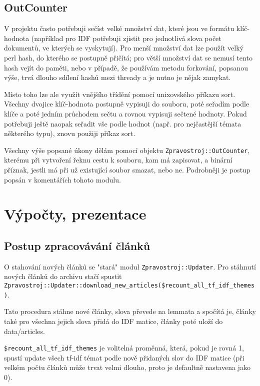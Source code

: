 \documentclass[12pt,a4paper]{report}
\begin{document}
\subsection{OutCounter}

V projektu často potřebuji sečíst velké množství dat, které jsou ve formátu klíč-hodnota (například pro IDF potřebuji zjistit pro jednotlivá slova počet dokumentů, ve kterých se vyskytují). Pro menší množství dat lze použít velký perl hash, do kterého se postupně přičítá; pro větší množství dat se nemusí tento hash vejít do paměti, nebo v případě, že používám metodu forkování, popsanou výše, trvá dlouho sdílení hashů mezi thready a je nutno je nějak zamykat.

Místo toho lze ale využít vnějšího třídění pomocí unixovského příkazu sort. Všechny dvojice klíč-hodnota postupně vypisuji do souboru, poté seřadím podle klíče a poté jedním průchodem sečtu a rovnou vypisuji sečtené hodnoty. Pokud potřebuji ještě naopak seřadit vše podle hodnot (např. pro nejčastější témata některého typu), znovu použiji příkaz sort.

Všechny výše popsané úkony dělám pomocí objektu \texttt{Zpravostroj::OutCounter}, kterému při vytvoření řeknu cestu k souboru, kam má zapisovat, a binární příznak, jestli má při už existující soubor smazat, nebo ne. Podrobněji je postup popsán v komentářích tohoto modulu.

\section{Výpočty, prezentace}
\subsection{Postup zpracovávání článků}

O stahování nových článků se "stará" modul \texttt{Zpravostroj::Updater}. Pro stáhnutí nových článků do archivu stačí spustit \texttt{Zpravostroj::Updater::download\_new\_articles(\$recount\_all\_tf\_idf\_themes)}.

Tato procedura stáhne nové články, slova převede na lemmata a spočítá je, články také pro všechna jejich slova přidá do IDF matice, články poté uloží do data/articles.

\texttt{\$recount\_all\_tf\_idf\_themes} je volitelná proměnná, která, pokud je rovná 1, spustí update všech tf-idf témat podle nově přidaných slov do IDF matice (při velkém počtu článků může trvat velmi dlouho, proto je defaultně nastavena jako 0).
\end{document}
